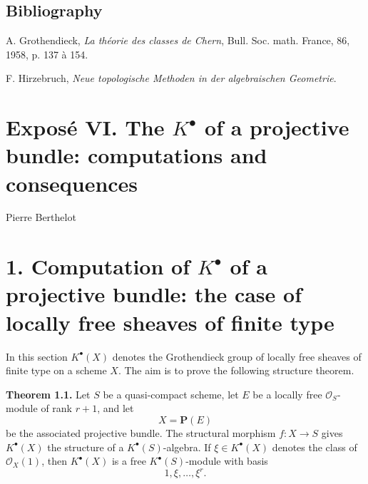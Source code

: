\subsection*{Bibliography}
\begin{enumerate}[label={[\arabic*]}]
\item A. Grothendieck, \emph{La théorie des classes de Chern}, Bull. Soc. math. France, 86, 1958, p. 137 à 154.
\item F. Hirzebruch, \emph{Neue topologische Methoden in der algebraischen Geometrie}.
\end{enumerate}



\providecommand{\Sym}{\operatorname{Sym}}
\providecommand{\Proj}{\operatorname{Proj}}
\providecommand{\Projz}{\operatorname{Proj}_0}
\providecommand{\Spec}{\operatorname{Spec}}
\providecommand{\Comp}{\operatorname{Comp}}
\providecommand{\Dplus}{D_{+}}
\providecommand{\id}{\operatorname{id}}
\providecommand{\cG}{\mathcal G}
\providecommand{\cA}{\mathcal A}
\providecommand{\cB}{\mathcal B}
\providecommand{\cL}{\mathscr L}
\providecommand{\cM}{\mathscr M}
\providecommand{\cN}{\mathscr N}
\providecommand{\cE}{\mathscr E}
\providecommand{\cK}{\mathscr K}
\providecommand{\cP}{\mathscr P}
\providecommand{\cQ}{\mathscr Q}
\providecommand{\OO}{\mathcal O}
\providecommand{\rk}{\operatorname{rk}}
\providecommand{\colim}{\operatorname*{colim}}


\section*{Exposé VI. The \(K^\bullet\) of a projective bundle: computations and consequences}
\begin{center}
Pierre Berthelot
\end{center}

\section*{1. Computation of \(K^\bullet\) of a projective bundle: the case of locally free sheaves of finite type}

In this section \(K^\bullet(X)\) denotes the Grothendieck group of locally free sheaves of finite type on a scheme \(X\). The aim is to prove the following structure theorem.

\textbf{Theorem 1.1.} Let \(S\) be a quasi-compact scheme, let \(E\) be a locally free \(\mathcal O_S\)-module of rank \(r+1\), and let
\[
  X=\mathbf P(E)
\]
be the associated projective bundle. The structural morphism \(f:X\to S\) gives \(K^\bullet(X)\) the structure of a \(K^\bullet(S)\)-algebra. If \(\xi\in K^\bullet(X)\) denotes the class of \(\mathcal O_X(1)\), then \(K^\bullet(X)\) is a free \(K^\bullet(S)\)-module with basis
\[
  1,\xi,\ldots,\xi^r .
\]

